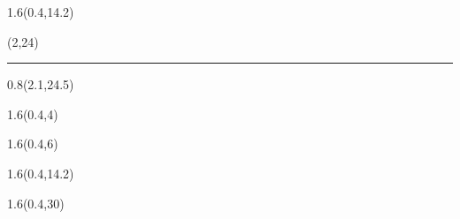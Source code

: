 \begin{frame}[plain]
  \begin{textblock*}{1.6\TPHorizModule}(0.4\TPHorizModule,14.2\TPVertModule)
    \titlefmt
  \end{textblock*}

  \begin{textblock*}{\TPHorizModule}(2\TPHorizModule,24\TPVertModule)
    \textcolor{white}{\rule{\linewidth}{2\TPVertModule}}
  \end{textblock*}

  \begin{textblock*}{0.8\TPHorizModule}(2.1\TPHorizModule,24.5\TPVertModule)
    \subtitlefmt
  \end{textblock*}
\end{frame}


\begin{frame}[plain]
  \begin{textblock*}{1.6\TPHorizModule}(0.4\TPHorizModule,4\TPVertModule)
    \authorfmt
  \end{textblock*}

  \begin{textblock*}{1.6\TPHorizModule}(0.4\TPHorizModule,6\TPVertModule)
    \affiliation
  \end{textblock*}

  \begin{textblock*}{1.6\TPHorizModule}(0.4\TPHorizModule,14.2\TPVertModule)
    \titlefmt
  \end{textblock*}

  \begin{textblock*}{1.6\TPHorizModule}(0.4\TPHorizModule,30\TPVertModule)
    \edition
  \end{textblock*}
\end{frame}
\endgroup

